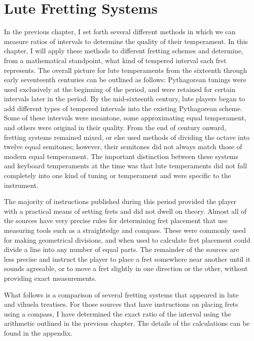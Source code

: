 
\chapter{Lute Fretting Systems}

In the previous chapter, I set forth several different methods in which we can measure ratios of intervals to determine
the quality of their temperament. In this chapter, I will apply these methods to different fretting schemes and
determine, from a mathematical standpoint, what kind of tempered interval each fret represents. The overall picture for
lute temperaments from the sixteenth through early seventeenth centuries can be outlined as follows: Pythagorean tunings
were used exclusively at the beginning of the period, and were retained for certain intervals later in the period. By
the mid-sixteenth century, lute players began to add different types of tempered intervals into the existing Pythagorean
scheme. Some of these intervals were meantone, some approximating equal temperament, and others were original in their
quality. From the end of century onward, fretting systems remained mixed, or else used methods of dividing the octave
into twelve equal semitones; however, their semitones did not always match those of modern equal temperament. The
important distinction between these systems and keyboard temperaments at the time was that lute temperaments did not
fall completely into one kind of tuning or temperament and were specific to the instrument.

The majority of instructions published during this period provided the player with a practical means of setting frets
and did not dwell on theory. Almost all of the sources have very precise rules for determining fret placement that use
measuring tools such as a straightedge and compass. These were commonly used for making geometrical divisions, and
when used to calculate fret placement could divide a line into any number of equal parts. The remainder of the sources
are less precise and instruct the player to place a fret somewhere near another until it sounds agreeable, or to move a
fret slightly in one direction or the other, without providing exact measurements.

What follows is a comparison of several fretting systems that appeared in lute and vihuela treatises. For those sources
that have instructions on placing frets using a compass, I have determined the exact ratio of the interval using the
arithmetic  outlined in the previous chapter. The details of the calculations can be found in the appendix.

